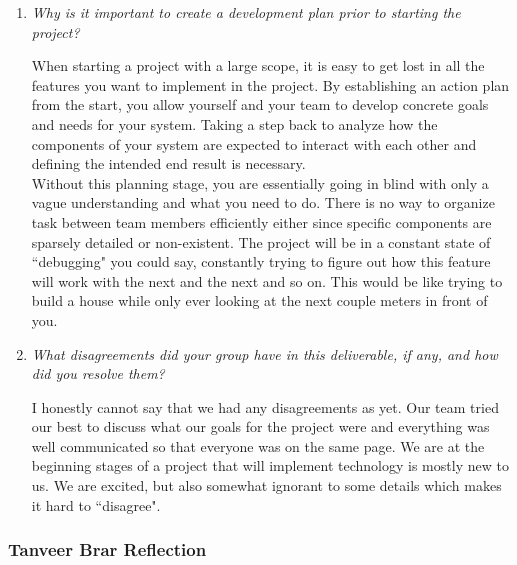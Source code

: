 \documentclass{article}
\begin{document}
\begin{enumerate}

  \item \textit{Why is it important to create a development plan
    prior to starting the project?}

    When starting a project with a large scope, it is easy to get
    lost in all the features you want to implement in the project.
    By establishing an action plan from the start, you allow yourself
    and your team to develop concrete goals and needs for your
    system. Taking a step back to analyze how the components of your
    system are expected to interact with each other and defining the
    intended end result is necessary.\\

    Without this planning stage, you are essentially going in blind with only a vague understanding and what you need to do. There is
    no way to organize task between team members efficiently either since specific components are sparsely detailed or non-existent. The
    project will be in a constant state of ``debugging" you could say, constantly trying to figure out how this feature will work with the
    next and the next and so on. This would be like trying to build a house while only ever looking at the next couple meters in front of you.

  \item \textit{What disagreements did your group have in this deliverable, if any, and how did you resolve them?}
  
  I honestly cannot say that we had any disagreements as yet. Our team tried our best to discuss what our goals for the project were and
  everything was well communicated so that everyone was on the same page. We are at the beginning stages of a project that will implement
  technology is mostly new to us. We are excited, but also somewhat ignorant to some details which makes it hard to ``disagree".

\end{enumerate}

\subsubsection*{Tanveer Brar Reflection}
\end{document}
